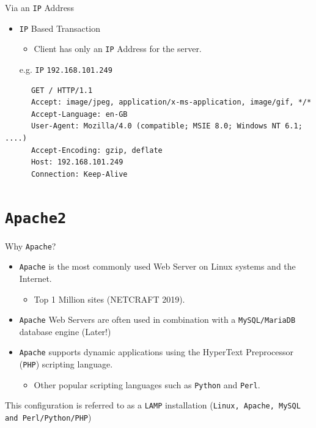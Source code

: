 \documentclass[xcolor=table]{beamer}
\begin{document}
\begin{frame}[fragile]{Via an \texttt{IP} Address}
  \begin{itemize}
      \item \texttt{IP} Based Transaction
        \begin{itemize}
          \item Client has only an \texttt{IP} Address for the server.
        \end{itemize}
      \begin{center}
        e.g. \texttt{IP} \texttt{192.168.101.249}        
      \end{center}
    \end{itemize}
  \begin{tcolorbox}
    \lstset{
      basicstyle=\tiny\ttfamily,
    }
    \begin{lstlisting}
      GET / HTTP/1.1
      Accept: image/jpeg, application/x-ms-application, image/gif, */*
      Accept-Language: en-GB
      User-Agent: Mozilla/4.0 (compatible; MSIE 8.0; Windows NT 6.1; ....)
      Accept-Encoding: gzip, deflate
      Host: 192.168.101.249
      Connection: Keep-Alive
    \end{lstlisting}
  \end{tcolorbox}
\end{frame}

\section{\texttt{Apache2}}
\begin{frame}{Why \texttt{Apache}?}
  \begin{itemize}
    \item \texttt{Apache} is the most commonly used Web Server on Linux systems and the Internet.
      \begin{itemize}
        \item Top 1 Million sites (NETCRAFT 2019).
      \end{itemize}
    \item \texttt{Apache} Web Servers are often used in combination with a \texttt{MySQL/MariaDB} database engine (Later!)
    \item \texttt{Apache} supports dynamic applications using the HyperText Preprocessor (\texttt{PHP}) scripting language. 
      \begin{itemize}
        \item Other popular scripting languages such as \texttt{Python} and \texttt{Perl}.
      \end{itemize}
  \end{itemize}
  \begin{tcolorbox}
    \begin{center}
      \scriptsize This configuration is referred to as a \texttt{LAMP} installation (\texttt{Linux, Apache, MySQL and Perl/Python/PHP})
    \end{center}
  \end{tcolorbox}
\end{frame}
\end{document}
